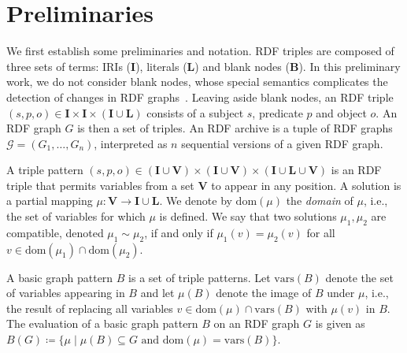 \documentclass{llncs}
\newcommand{\B}{\ensuremath{\mathbf{B}}\xspace}
\newcommand{\I}{\ensuremath{\mathbf{I}}\xspace}
\renewcommand{\L}{\ensuremath{\mathbf{L}}\xspace}
\newcommand{\V}{\ensuremath{\mathbf{V}}\xspace}
\newcommand{\dom}[1]{\ensuremath{\mathrm{dom}(#1)}}
\newcommand{\vars}[1]{\ensuremath{\mathrm{vars}(#1)}}
\begin{document}




\section{Preliminaries}

We first establish some preliminaries and notation. RDF triples are composed of three sets of terms: IRIs (\I), literals (\L) and blank nodes (\B). In this preliminary work, we do not consider blank nodes, whose special semantics complicates the detection of changes in RDF graphs~\cite{ZeginisTC11}. Leaving aside blank nodes, an RDF triple $(s,p,o) \in \I \times \I \times (\I \cup \L)$ consists of a subject $s$, predicate $p$ and object $o$. An RDF graph $G$ is then a set of triples. An RDF archive is a tuple of RDF graphs $\mathcal{G} = (G_1,\ldots,G_n)$, interpreted as $n$ sequential versions of a given RDF graph. 

A triple pattern $(s,p,o) \in (\I \cup \V) \times (\I \cup \V) \times (\I \cup \L \cup \V)$ is an RDF triple that permits variables from a set $\V$ to appear in any position. A solution is a partial mapping $\mu : \V \rightarrow \I \cup \L$. We denote by $\dom{\mu}$ the \textit{domain} of $\mu$, i.e., the set of variables for which $\mu$ is defined. We say that two solutions $\mu_1, \mu_2$ are compatible, denoted $\mu_1 \sim \mu_2$, if and only if $\mu_1(v) = \mu_2(v)$ for all $v \in \dom{\mu_1} \cap \dom{\mu_2}$.

A basic graph pattern $B$ is a set of triple patterns. Let $\vars{B}$ denote the set of variables appearing in $B$ and let $\mu(B)$ denote the image of $B$ under $\mu$, i.e., the result of replacing all variables $v \in \dom{\mu} \cap \vars{B}$ with $\mu(v)$ in $B$. The evaluation of a basic graph pattern $B$ on an RDF graph $G$ is given as $B(G) \coloneqq \{ \mu \mid \mu(B) \subseteq G\text{ and }\dom{\mu} = \vars{B} \}$.
\end{document}
